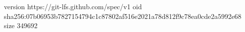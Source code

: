 version https://git-lfs.github.com/spec/v1
oid sha256:07b06953b7827154794c1c87802af516e2021a78d812f9c78ea0cde2a5992e68
size 349692
